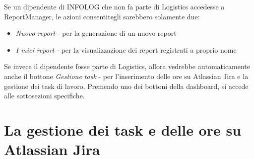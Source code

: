 Se un dipendente di INFOLOG che non fa parte di Logistics accedesse a ReportManager, le azioni consentitegli sarebbero solamente due:
\begin{itemize}
    \item \emph{Nuovo report} - per la generazione di un nuovo report
    \item \emph{I miei report} - per la visualizzazione dei report registrati a proprio nome
\end{itemize}
Se invece il dipendente fosse parte di Logistics, allora vedrebbe automaticamente anche il bottone \emph{Gestione task} - per l'inserimento delle ore su Atlassian Jira
e la gestione dei task di lavoro.
Premendo uno dei bottoni della dashboard, si accede alle sottosezioni specifiche.

\section{La gestione dei task e delle ore su Atlassian Jira}

